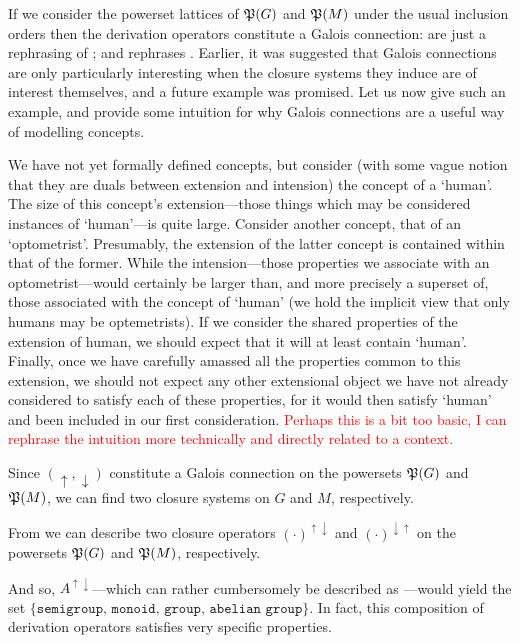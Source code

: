 If we consider the powerset lattices of $\mathfrak{P}({G})$ and $\mathfrak{P}({M})$ under the usual inclusion orders then the derivation operators constitute a Galois connection: 
are just a rephrasing of ; and  rephrases . Earlier,
it was suggested that Galois connections are only particularly interesting when the closure systems they induce are of interest themselves, and a future example was promised. Let
us now give such an example, and provide some intuition for why Galois connections are a useful way of modelling concepts.

We have not yet formally defined concepts, but consider (with some vague notion that they are duals between extension and intension) the concept of a `human'. The size of this concept's
extension---those things which may be considered instances of `human'---is quite large. Consider another concept, that of an `optometrist'. Presumably, the extension of the latter concept
is contained within that of the former. While the intension---those properties we associate with an optometrist---would certainly be larger than, and more precisely a superset of,
those associated with the concept of `human' (we hold the implicit view that only humans may be optemetrists). If we consider the shared properties of the extension of human, we
should expect that it will at least contain `human'. Finally, once we have carefully amassed all the properties common to this extension, we should not expect any other extensional
object we have not already considered to satisfy each of these properties, for it would then satisfy `human' and been included in our first consideration. \textcolor{red}{Perhaps
this is a bit too basic, I can rephrase the intuition more technically and directly related to a context.}

Since $(\uparrow, \downarrow)$ constitute a Galois connection on the powersets $\mathfrak{P}({G})$ and $\mathfrak{P}({M})$, we can find two closure systems on $G$ and $M$, respectively.

From  we can describe two closure operators $(\cdot)^{\uparrow \downarrow}$ and $(\cdot)^{\downarrow \uparrow}$ on the powersets $\mathfrak{P}({G})$ and $\mathfrak{P}({M})$, respectively.

And so, $A^{\uparrow \downarrow}$---which can rather cumbersomely be described as ---would
yield the set $\{\texttt{semigroup, monoid, group, abelian group}\}$. In fact, this composition of derivation operators satisfies very specific properties.%

